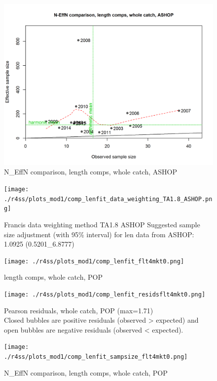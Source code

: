 \documentclass[12pt,]{article}
\begin{document}
\begin{figure}
\centering
\includegraphics{./r4ss/plots_mod1/comp_lenfit_sampsize_flt2mkt0.png}
\caption{N\_EffN comparison, length comps, whole catch, ASHOP
\label{fig:mod1_12_comp_lenfit_sampsize_flt2mkt0}}
\end{figure}

\begin{figure}
\centering
\texttt{[image: ./r4ss/plots\_mod1/comp\_lenfit\_data\_weighting\_TA1.8\_ASHOP.png]}
\caption{Francis data weighting method TA1.8 ASHOP Suggested sample size
adjustment (with 95\% interval) for len data from ASHOP: 1.0925
(0.5201\_6.8777)
\label{fig:mod1_13_comp_lenfit_data_weighting_TA1.8_ASHOP}}
\end{figure}

\begin{figure}
\centering
\texttt{[image: ./r4ss/plots\_mod1/comp\_lenfit\_flt4mkt0.png]}
\caption{length comps, whole catch, POP
\label{fig:mod1_14_comp_lenfit_flt4mkt0}}
\end{figure}

\begin{figure}
\centering
\texttt{[image: ./r4ss/plots\_mod1/comp\_lenfit\_residsflt4mkt0.png]}
\caption{Pearson residuals, whole catch, POP (max=1.71)\\
Closed bubbles are positive residuals (observed \textgreater{} expected)
and open bubbles are negative residuals (observed \textless{} expected).
\label{fig:mod1_15_comp_lenfit_residsflt4mkt0}}
\end{figure}

\begin{figure}
\centering
\texttt{[image: ./r4ss/plots\_mod1/comp\_lenfit\_sampsize\_flt4mkt0.png]}
\caption{N\_EffN comparison, length comps, whole catch, POP
\label{fig:mod1_16_comp_lenfit_sampsize_flt4mkt0}}
\end{figure}
\end{document}
